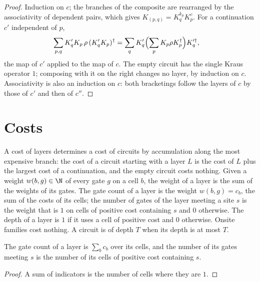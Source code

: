 \begin{proof}\leanok
    Induction on $c$; the branches of the composite are rearranged by the
    associativity of dependent pairs, which gives $K_{(p,q)}=K^{k_p}_qK^c_p$. For a
    continuation $c'$ independent of $p$,
    \begin{align}
        \sum_{p,q}K'_qK_p\,\rho\,(K'_qK_p)^\dagger
        &=\sum_qK'_q\Bigl(\sum_pK_p\rho K_p^\dagger\Bigr)K'^\dagger_q,
        \notag
    \end{align}
    the map of $c'$ applied to the map of $c$. The empty circuit has the single
    Kraus operator $1$; composing with it on the right changes no layer, by
    induction on $c$. Associativity is also an induction on $c$: both bracketings follow the
    layers of $c$ by those of $c'$ and then of $c''$.
\end{proof}

\section{Costs}
\label{sec:circuits_costs}

\begin{definition}
    \label{def:circuits_costs}
    \leanok
    A cost of layers determines a cost of circuits by accumulation along the most
    expensive branch: the cost of a circuit starting with a layer $L$ is the cost of $L$
    plus the largest cost of a continuation, and the empty circuit costs nothing. Given a
    weight $w(b,g)\in\N$ of every gate $g$ on a cell $b$,
    the weight of a layer is the sum of the weights of its gates. The gate count of
    a layer is the weight $w(b,g)=c_b$, the sum of the costs of its cells; the
    number of gates of the layer meeting a site $s$ is the weight that is $1$ on
    cells of positive cost containing $s$ and $0$ otherwise. The depth of a layer is
    $1$ if it uses a cell of positive cost and $0$ otherwise. Onsite families cost
    nothing. A circuit is of depth $T$ when its depth is at most $T$.
\end{definition}

\begin{lemma}
    \label{lem:circuits_cell_cost}
    \leanok
    The gate count of a layer is $\sum_bc_b$ over its cells, and the number of its
    gates meeting $s$ is the number of its cells of positive cost containing $s$.
\end{lemma}
\begin{proof}\leanok
    A sum of indicators is the number of cells where they are $1$.
\end{proof}

